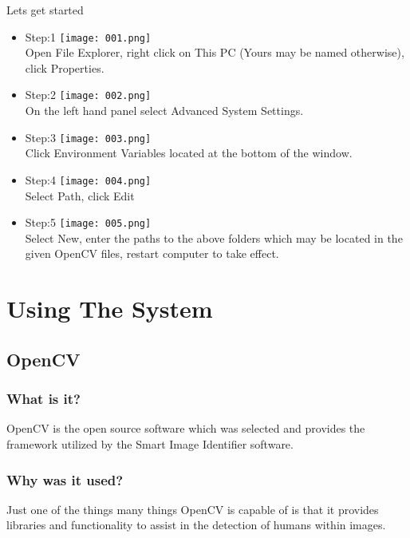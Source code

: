 \documentclass[a4paper,12pt]{report}
\begin{document}
	Lets get started
	
	\begin{itemize}
		\item Step:1	\linebreak
		\texttt{[image: 001.png]}\\
		\linebreak
		Open File Explorer, right click on This PC (Yours may be named otherwise), click Properties.
		\pagebreak
		\item Step:2	\linebreak
		\texttt{[image: 002.png]}\\ 
		\linebreak 
		On the left hand panel select Advanced System Settings.
		\item Step:3	\linebreak
		\texttt{[image: 003.png]}\\
		\linebreak
		Click Environment Variables located at the bottom of the window.	
		\pagebreak
		\item Step:4	\linebreak
		\texttt{[image: 004.png]}\\
		\linebreak
		Select Path, click Edit	
		\item Step:5	\linebreak
		\texttt{[image: 005.png]}\\
		\linebreak
		Select New, enter the paths to the above folders which may be located in the given
		OpenCV files, restart computer to take effect.
	\end{itemize}
	
	\section{Using The System}
	\subsection{OpenCV}
	\subsubsection{What is it?}
	OpenCV is the open source software which was selected and provides the framework
	utilized by the Smart Image Identifier software.
	\subsubsection{Why was it used?}
	Just one of the things many things OpenCV is capable of is that it provides libraries and
	functionality to assist in the detection of humans within images.
\end{document}
